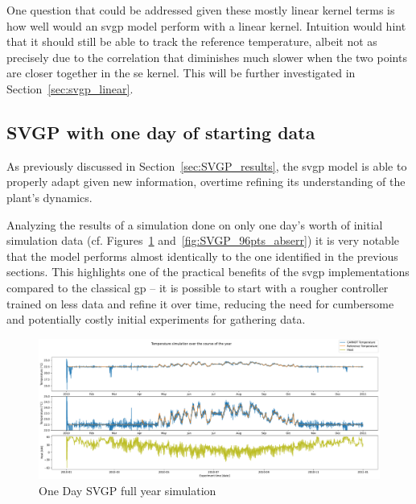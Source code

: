 One question that could be addressed given these mostly linear kernel terms is
how well would an \acrshort{svgp} model perform with a linear kernel.
Intuition would hint that it should still be able to track the reference
temperature, albeit not as precisely due to the correlation that diminishes much
slower when the two points are closer together in the \acrshort{se} kernel. This
will be further investigated in Section~\ref{sec:svgp_linear}.

\clearpage

\subsection{SVGP with one day of starting data}\label{sec:svgp_96pts}

As previously discussed in Section~\ref{sec:SVGP_results}, the \acrshort{svgp}
model is able to properly adapt given new information, overtime refining its
understanding of the plant's dynamics.

Analyzing the results of a simulation done on only one day's worth of initial
simulation data (cf. Figures~\ref{fig:SVGP_96pts_fullyear_simulation}
and~\ref{fig:SVGP_96pts_abserr}) it is very notable that the model performs
almost identically to the one identified in the previous sections. This
highlights one of the practical benefits of the \acrshort{svgp} implementations
compared to the classical \acrlong{gp} -- it is possible to start with a rougher
controller trained on less data and refine it over time, reducing the need for
cumbersome and potentially costly initial experiments for gathering data.

\begin{figure}[ht]
    \centering
    \includegraphics[width =
    \textwidth]{Plots/6_SVGP_96pts_inf_window_12_averageYear_fullyear.pdf}
    \caption{One Day SVGP full year simulation}
    \label{fig:SVGP_96pts_fullyear_simulation}
\end{figure}

